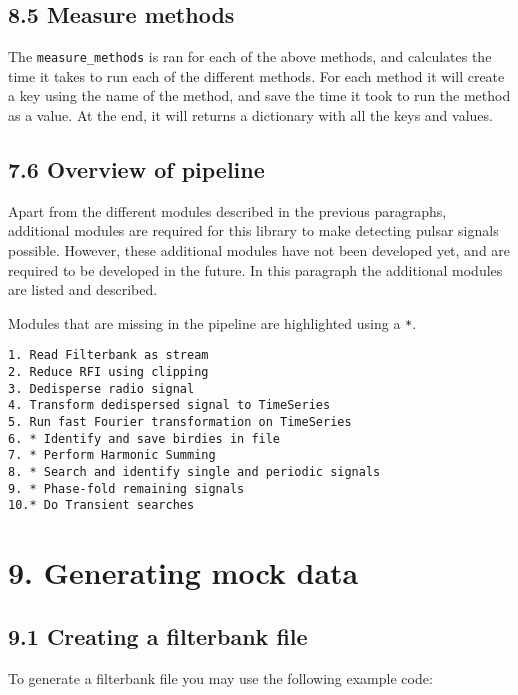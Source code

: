 \documentclass[]{article}
\begin{document}
\subsection{8.5 Measure methods}\label{measure-methods}

The \texttt{measure\_methods} is ran for each of the above methods, and
calculates the time it takes to run each of the different methods. For
each method it will create a key using the name of the method, and save
the time it took to run the method as a value. At the end, it will
returns a dictionary with all the keys and values.

\subsection{7.6 Overview of pipeline}\label{overview-of-pipeline}

Apart from the different modules described in the previous paragraphs,
additional modules are required for this library to make detecting
pulsar signals possible. However, these additional modules have not been
developed yet, and are required to be developed in the future. In this
paragraph the additional modules are listed and described.

Modules that are missing in the pipeline are highlighted using a
\texttt{*}.

\begin{verbatim}
1. Read Filterbank as stream
2. Reduce RFI using clipping
3. Dedisperse radio signal
4. Transform dedispersed signal to TimeSeries
5. Run fast Fourier transformation on TimeSeries
6. * Identify and save birdies in file
7. * Perform Harmonic Summing
8. * Search and identify single and periodic signals
9. * Phase-fold remaining signals
10.* Do Transient searches
\end{verbatim}

\section{9. Generating mock data}\label{generating-mock-data}

\subsection{9.1 Creating a filterbank
file}\label{creating-a-filterbank-file}

To generate a filterbank file you may use the following example code:
\end{document}
